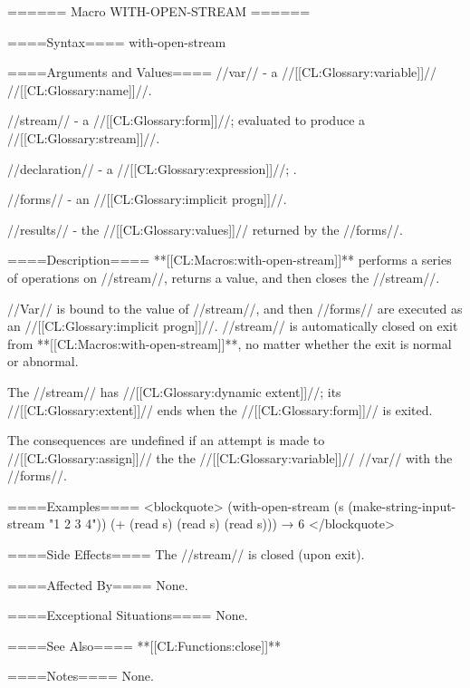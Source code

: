 ====== Macro WITH-OPEN-STREAM ======

====Syntax====
\DefmacWithValuesNewline with-open-stream {  } {}

====Arguments and Values====
//var// - a //[[CL:Glossary:variable]]// //[[CL:Glossary:name]]//.

//stream// - a //[[CL:Glossary:form]]//; evaluated to produce a //[[CL:Glossary:stream]]//.

//declaration// - a  //[[CL:Glossary:expression]]//; \noeval.

//forms// - an //[[CL:Glossary:implicit progn]]//.

//results// - the //[[CL:Glossary:values]]// returned by the //forms//.

====Description====
**[[CL:Macros:with-open-stream]]** performs a series of operations on //stream//, returns a value, and then closes the //stream//.

//Var// is bound to the value of //stream//, and then //forms// are executed as an //[[CL:Glossary:implicit progn]]//. //stream// is automatically closed on exit from **[[CL:Macros:with-open-stream]]**, no matter whether the exit is normal or abnormal.

The //stream// has //[[CL:Glossary:dynamic extent]]//; its //[[CL:Glossary:extent]]// ends when the //[[CL:Glossary:form]]// is exited.

The consequences are undefined if an attempt is made to //[[CL:Glossary:assign]]// the the //[[CL:Glossary:variable]]// //var// with the //forms//.

====Examples====
<blockquote> (with-open-stream (s (make-string-input-stream "1 2 3 4")) (+ (read s) (read s) (read s))) → 6 </blockquote>

====Side Effects====
The //stream// is closed (upon exit).

====Affected By====
None.

====Exceptional Situations====
None.

====See Also====
**[[CL:Functions:close]]**

====Notes====
None.

  
